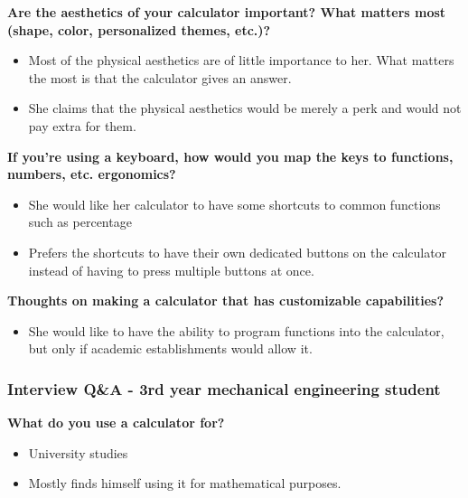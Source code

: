 \documentclass[a4paper]{article}
\begin{document}
\textbf{Are the aesthetics of your calculator important? What matters most (shape, color,  personalized themes, etc.)?}
\begin{itemize}
\itemsep0em 
\item Most of the physical aesthetics are of little importance to her. What matters the most is that the calculator gives an answer.
\item She claims that the physical aesthetics would be merely a perk and would not pay extra for them.
\end{itemize}

\textbf{If you’re using a keyboard, how would you map the keys to functions, numbers, etc. ergonomics?}
\begin{itemize}
\itemsep0em 
\item She would like her calculator to have some shortcuts to common functions such as percentage 
\item Prefers the shortcuts to have their own dedicated buttons on the calculator instead of having to press multiple buttons at once.
\end{itemize}

\textbf{Thoughts on making a calculator that has customizable capabilities? }
\begin{itemize}
\itemsep0em 
\item She would like to have the ability to program functions into the calculator, but only if academic establishments would allow it. 
\end{itemize}
\pagebreak


\subsubsection*{Interview Q\&A - 3rd year mechanical engineering student}
\textbf{What do you use a calculator for?}
\begin{itemize}
\itemsep0em 
\item University studies
\item Mostly finds himself using it for mathematical purposes. 
\end{itemize}
\end{document}
